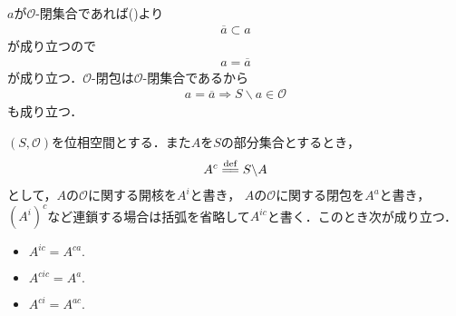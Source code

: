 	\begin{sketch}
		$a$が$\mathscr{O}$-閉集合であれば()より
		\begin{align}
			\overline{a} \subset a
		\end{align}
		が成り立つので
		\begin{align}
			a = \overline{a}
		\end{align}
		が成り立つ．$\mathscr{O}$-閉包は$\mathscr{O}$-閉集合であるから
		\begin{align}
			a = \overline{a} \Longrightarrow S \backslash a \in \mathscr{O}
		\end{align}
		も成り立つ．
		\QED
	\end{sketch}
	
	\begin{screen}
		\begin{thm}[開核の補集合は補集合の閉包]
		\label{thm:topology_note_closure_interior}
			$(S,\mathscr{O})$を位相空間とする．また$A$を$S$の部分集合とするとき，
			\begin{align}
				A^c \defeq S \backslash A
			\end{align}
			として，$A$の$\mathscr{O}$に関する開核を$A^i$と書き，
			$A$の$\mathscr{O}$に関する閉包を$A^a$と書き，
			$(A^i)^c$など連鎖する場合は括弧を省略して$A^{ic}$と書く．このとき次が成り立つ．
			\begin{itemize}
				\item $A^{ic} = A^{ca}.$
				\item $A^{cic} = A^a.$
				\item $A^{ci} = A^{ac}.$
			\end{itemize}
		\end{thm}
	\end{screen}
	
